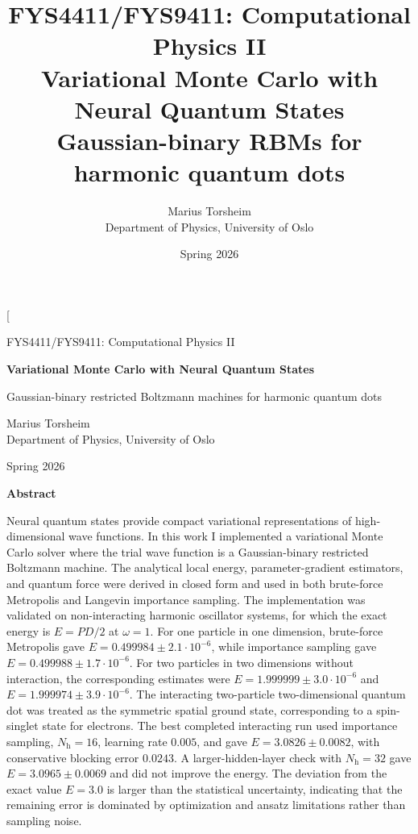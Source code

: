 \documentclass[10pt,a4paper]{article}
\title{\vspace{-1.0cm}\Large FYS4411/FYS9411: Computational Physics II\\[0.35cm]
\Huge Variational Monte Carlo with Neural Quantum States\\[0.20cm]
\LARGE Gaussian-binary RBMs for harmonic quantum dots}
\author{Marius Torsheim\\Department of Physics, University of Oslo}
\date{Spring 2026}
\newcommand{\Nh}{N_{\mathrm{h}}}
\begin{document}
\twocolumn[
\begin{center}
{\large FYS4411/FYS9411: Computational Physics II\par}
\vspace{0.25cm}
{\LARGE\bfseries Variational Monte Carlo with Neural Quantum States\par}
\vspace{0.12cm}
{\large Gaussian-binary restricted Boltzmann machines for harmonic quantum dots\par}
\vspace{0.35cm}
{Marius Torsheim\\Department of Physics, University of Oslo\par}
\vspace{0.15cm}
{Spring 2026\par}
\end{center}

\begin{center}
\textbf{Abstract}
\end{center}
\noindent Neural quantum states provide compact variational representations of high-dimensional wave functions. In this work I implemented a variational Monte Carlo solver where the trial wave function is a Gaussian-binary restricted Boltzmann machine. The analytical local energy, parameter-gradient estimators, and quantum force were derived in closed form and used in both brute-force Metropolis and Langevin importance sampling. The implementation was validated on non-interacting harmonic oscillator systems, for which the exact energy is $E=PD/2$ at $\omega=1$. For one particle in one dimension, brute-force Metropolis gave $E=0.499984\pm2.1\cdot10^{-6}$, while importance sampling gave $E=0.499988\pm1.7\cdot10^{-6}$. For two particles in two dimensions without interaction, the corresponding estimates were $E=1.999999\pm3.0\cdot10^{-6}$ and $E=1.999974\pm3.9\cdot10^{-6}$. The interacting two-particle two-dimensional quantum dot was treated as the symmetric spatial ground state, corresponding to a spin-singlet state for electrons. The best completed interacting run used importance sampling, $\Nh=16$, learning rate $0.005$, and gave $E=3.0826\pm0.0082$, with conservative blocking error $0.0243$. A larger-hidden-layer check with $\Nh=32$ gave $E=3.0965\pm0.0069$ and did not improve the energy. The deviation from the exact value $E=3.0$ is larger than the statistical uncertainty, indicating that the remaining error is dominated by optimization and ansatz limitations rather than sampling noise.
\end{document}
